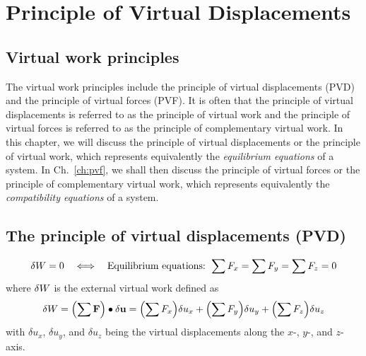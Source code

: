 \chapter{Principle of Virtual Displacements}
\label{ch:pvd1}

\section{Virtual work principles}
The virtual work principles include the principle of virtual displacements (PVD) and the principle of virtual forces (PVF). It is often that the principle of virtual displacements is referred to as the principle of virtual work and the principle of virtual forces is referred to as the principle of complementary virtual work. In this chapter, we will discuss the principle of virtual displacements or the principle of virtual work, which represents equivalently the \emph{equilibrium equations} of a system. In Ch.~\ref{ch:pvf}, we shall then discuss the principle of virtual forces or the principle of complementary virtual work, which represents equivalently the \emph{compatibility equations} of a system.

\section{The principle of virtual displacements (PVD)}
\begin{equation}
  \delta W = 0 \quad\Longleftrightarrow\quad \text{Equilibrium equations: } \sum F_x = \sum F_y = \sum F_z = 0
\end{equation}
where $\delta W$ is the external virtual work defined as
\begin{equation}
  \delta W = \Bigl(\sum\mathbf{F}\Bigr)\bullet\delta\mathbf{u} = \Bigl(\sum F_x\Bigr)\delta u_x + \Bigl(\sum F_y\Bigr)\delta u_y + \Bigl(\sum F_z\Bigr)\delta u_z
\end{equation}
with $\delta u_x$, $\delta u_y$, and $\delta u_z$ being the virtual displacements along the $x$-, $y$-, and $z$-axis.


